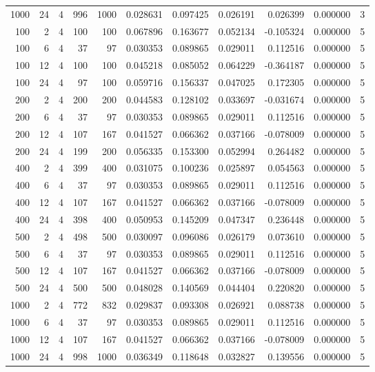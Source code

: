 \begin{table}
\begin{tabular}{rrrrrrrrrrr}
1000 & 24 & 4 & 996 & 1000 & 0.028631 & 0.097425 & 0.026191 & 0.026399 & 0.000000 & 3 \\
100 & 2 & 4 & 100 & 100 & 0.067896 & 0.163677 & 0.052134 & -0.105324 & 0.000000 & 5 \\
100 & 6 & 4 & 37 & 97 & 0.030353 & 0.089865 & 0.029011 & 0.112516 & 0.000000 & 5 \\
100 & 12 & 4 & 100 & 100 & 0.045218 & 0.085052 & 0.064229 & -0.364187 & 0.000000 & 5 \\
100 & 24 & 4 & 97 & 100 & 0.059716 & 0.156337 & 0.047025 & 0.172305 & 0.000000 & 5 \\
200 & 2 & 4 & 200 & 200 & 0.044583 & 0.128102 & 0.033697 & -0.031674 & 0.000000 & 5 \\
200 & 6 & 4 & 37 & 97 & 0.030353 & 0.089865 & 0.029011 & 0.112516 & 0.000000 & 5 \\
200 & 12 & 4 & 107 & 167 & 0.041527 & 0.066362 & 0.037166 & -0.078009 & 0.000000 & 5 \\
200 & 24 & 4 & 199 & 200 & 0.056335 & 0.153300 & 0.052994 & 0.264482 & 0.000000 & 5 \\
400 & 2 & 4 & 399 & 400 & 0.031075 & 0.100236 & 0.025897 & 0.054563 & 0.000000 & 5 \\
400 & 6 & 4 & 37 & 97 & 0.030353 & 0.089865 & 0.029011 & 0.112516 & 0.000000 & 5 \\
400 & 12 & 4 & 107 & 167 & 0.041527 & 0.066362 & 0.037166 & -0.078009 & 0.000000 & 5 \\
400 & 24 & 4 & 398 & 400 & 0.050953 & 0.145209 & 0.047347 & 0.236448 & 0.000000 & 5 \\
500 & 2 & 4 & 498 & 500 & 0.030097 & 0.096086 & 0.026179 & 0.073610 & 0.000000 & 5 \\
500 & 6 & 4 & 37 & 97 & 0.030353 & 0.089865 & 0.029011 & 0.112516 & 0.000000 & 5 \\
500 & 12 & 4 & 107 & 167 & 0.041527 & 0.066362 & 0.037166 & -0.078009 & 0.000000 & 5 \\
500 & 24 & 4 & 500 & 500 & 0.048028 & 0.140569 & 0.044404 & 0.220820 & 0.000000 & 5 \\
1000 & 2 & 4 & 772 & 832 & 0.029837 & 0.093308 & 0.026921 & 0.088738 & 0.000000 & 5 \\
1000 & 6 & 4 & 37 & 97 & 0.030353 & 0.089865 & 0.029011 & 0.112516 & 0.000000 & 5 \\
1000 & 12 & 4 & 107 & 167 & 0.041527 & 0.066362 & 0.037166 & -0.078009 & 0.000000 & 5 \\
1000 & 24 & 4 & 998 & 1000 & 0.036349 & 0.118648 & 0.032827 & 0.139556 & 0.000000 & 5 \\

\end{tabular}
\end{table}
